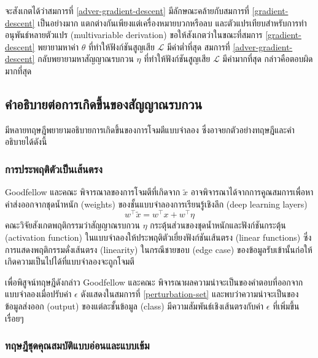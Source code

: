\documentclass{cpepaper}
\begin{document}
จะสังเกตได้ว่าสมการที่ \ref{adver-gradient-descent} มีลักษณะคล้ายกับสมการที่ \ref{gradient-descent} เป็นอย่างมาก แตกต่างกันเพียงแต่เครื่องหมายบวกหรือลบ และตัวแปรเทียบสำหรับการทำอนุพันธ์หลายตัวแปร (multivariable derivation) ขอให้สังเกตว่าในขณะที่สมการ \ref{gradient-descent} พยายามหาค่า $\theta$ ที่ทำให้ฟังก์ชันสูญเสีย $\mathcal{L}$ มีค่าต่ำที่สุด สมการที่ \ref{adver-gradient-descent} กลับพยายามหาสัญญาณรบกวน $\eta$ ที่ทำให้ฟังก์ชันสูญเสีย $\mathcal{L}$ มีค่ามากที่สุด กล่าวคือตอบผิดมากที่สุด

\subsection{คำอธิบายต่อการเกิดขึ้นของสัญญาณรบกวน}

มีหลายทฤษฎีพยายามอธิบายการเกิดขึ้นของการโจมตีแบบจำลอง ซึ่งอาจยกตัวอย่างทฤษฎีและคำอธิบายได้ดังนี้
\subsubsection{การประพฤติตัวเป็นเส้นตรง}
Goodfellow และคณะ พิจารณาลของการโจมตีที่เกิดจาก $\tilde{x}$ อาจพิจารณาได้จากการคูณสมการเพื่อหาค่าส่งออกจากชุดน้ำหนัก (weights) ของชั้นแบบจำลองการเรียนรู้เชิงลึก (deep learning layers) 
\begin{equation}
    w^\top\tilde{x} = w^\top x + w^\top \eta
\end{equation}
คณะวิจัยสังเกตพฤติกรรมว่าสัญญาณรบกวน $\eta$ กระตุ้นส่วนของชุดน้ำหนักและฟังก์ชันกระตุ้น (activation function) ในแบบจำลองให้ประพฤติตัวเยี่ยงฟังก์ชันเส้นตรง (linear functions) ซึ่งการแสดงพฤติกรรมดั่งเส้นตรง (linearity) ในกรณีชายขอบ (edge case) ของข้อมูลรับเข้านั้นก่อให้เกิดความเป็นไปได้ที่แบบจำลองจะถูกโจมตี

เพื่อพิสูจน์ทฤษฎีดังกล่าว Goodfellow และคณะ พิจารณาผลความน่าจะเป็นของคำตอบที่ออกจากแบบจำลองเมื่อปรับค่า $\epsilon$ ดังแสดงในสมการที่ \ref{perturbation-set} และพบว่าความน่าจะเป็นของข้อมูลส่งออก (output) ของแต่ละชั้นข้อมูล (class) มีความสัมพันธ์เชิงเส้นตรงกับค่า $\epsilon$ ที่เพิ่มขึ้นเรื่อยๆ

\subsubsection{ทฤษฎีชุดคุณสมบัติแบบอ่อนและแบบเข้ม}
\end{document}
